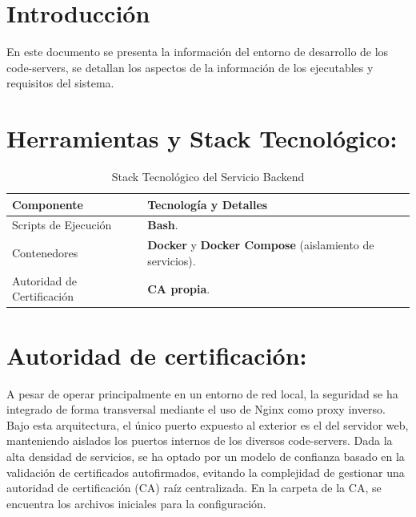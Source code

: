 \documentclass[12pt,a4paper]{report}
\begin{document}
 

\newpage
{}

\newpage
{}
\setcounter{page}{1}


\chapter{Introducción}
En este documento se presenta la información del entorno de desarrollo de los code-servers, se detallan los aspectos de la información de los ejecutables y requisitos del sistema. 
\chapter{Herramientas y Stack Tecnológico:}
\begin{table}[htbp]
    \centering
    \caption{Stack Tecnológico del Servicio Backend}
    \label{tab:stack_backend}
    \begin{tabularx}{\textwidth}{@{} l X @{}}
        \toprule
        \textbf{Componente} & \textbf{Tecnología y Detalles} \\
        \midrule
        Scripts de Ejecución & \textbf{Bash}. \\
        Contenedores & \textbf{Docker} y \textbf{Docker Compose} (aislamiento de servicios). \\
        Autoridad de Certificación & \textbf{CA propia}. \\ 
        \bottomrule
    \end{tabularx}
\end{table}

\chapter{Autoridad de certificación:}
A pesar de operar principalmente en un entorno de red local, la seguridad se ha integrado de forma transversal mediante el uso de Nginx como proxy inverso. Bajo esta arquitectura, el único puerto expuesto al exterior es el del servidor web, manteniendo aislados los puertos internos de los diversos code-servers. Dada la alta densidad de servicios, se ha optado por un modelo de confianza basado en la validación de certificados autofirmados, evitando la complejidad de gestionar una autoridad de certificación (CA) raíz centralizada. En la carpeta de la CA, se encuentra los archivos iniciales para la configuración.
\end{document}
